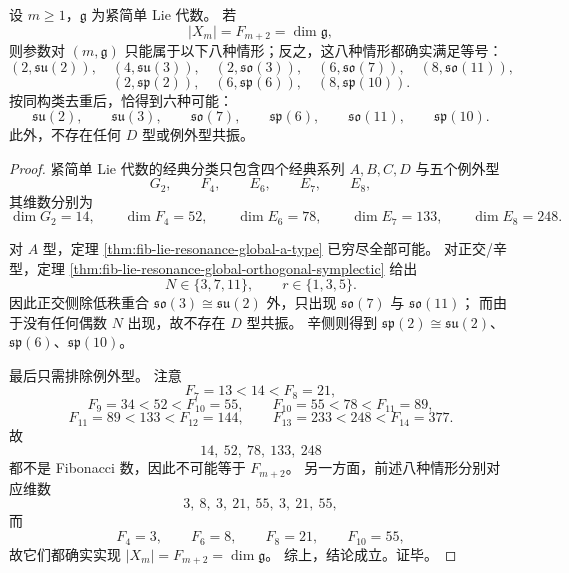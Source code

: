 \begin{theorem}\label{thm:fib-lie-resonance-global-classification}
设 \(m\ge 1\)，\(\mathfrak g\) 为紧简单 Lie 代数。
若
\[
|X_m|=F_{m+2}=\dim\mathfrak g,
\]
则参数对 \((m,\mathfrak g)\) 只能属于以下八种情形；反之，这八种情形都确实满足等号：
\[
(2,\mathfrak{su}(2)),\quad
(4,\mathfrak{su}(3)),\quad
(2,\mathfrak{so}(3)),\quad
(6,\mathfrak{so}(7)),\quad
(8,\mathfrak{so}(11)),
\]
\[
(2,\mathfrak{sp}(2)),\quad
(6,\mathfrak{sp}(6)),\quad
(8,\mathfrak{sp}(10)).
\]
按同构类去重后，恰得到六种可能：
\[
\mathfrak{su}(2),\qquad
\mathfrak{su}(3),\qquad
\mathfrak{so}(7),\qquad
\mathfrak{sp}(6),\qquad
\mathfrak{so}(11),\qquad
\mathfrak{sp}(10).
\]
此外，不存在任何 \(D\) 型或例外型共振。
\end{theorem}
\begin{proof}
紧简单 Lie 代数的经典分类只包含四个经典系列 \(A,B,C,D\) 与五个例外型
\[
G_2,\qquad F_4,\qquad E_6,\qquad E_7,\qquad E_8,
\]
其维数分别为
\[
\dim G_2=14,\qquad
\dim F_4=52,\qquad
\dim E_6=78,\qquad
\dim E_7=133,\qquad
\dim E_8=248.
\]

对 \(A\) 型，定理 \ref{thm:fib-lie-resonance-global-a-type} 已穷尽全部可能。
对正交/辛型，定理 \ref{thm:fib-lie-resonance-global-orthogonal-symplectic} 给出
\[
N\in\{3,7,11\},
\qquad
r\in\{1,3,5\}.
\]
因此正交侧除低秩重合 \(\mathfrak{so}(3)\cong\mathfrak{su}(2)\) 外，只出现 \(\mathfrak{so}(7)\) 与 \(\mathfrak{so}(11)\)；
而由于没有任何偶数 \(N\) 出现，故不存在 \(D\) 型共振。
辛侧则得到 \(\mathfrak{sp}(2)\cong\mathfrak{su}(2)\)、\(\mathfrak{sp}(6)\)、\(\mathfrak{sp}(10)\)。

最后只需排除例外型。
注意
\[
F_7=13<14<F_8=21,
\]
\[
F_9=34<52<F_{10}=55,
\qquad
F_{10}=55<78<F_{11}=89,
\]
\[
F_{11}=89<133<F_{12}=144,
\qquad
F_{13}=233<248<F_{14}=377.
\]
故
\[
14,\ 52,\ 78,\ 133,\ 248
\]
都不是 Fibonacci 数，因此不可能等于 \(F_{m+2}\)。
另一方面，前述八种情形分别对应维数
\[
3,\ 8,\ 3,\ 21,\ 55,\ 3,\ 21,\ 55,
\]
而
\[
F_4=3,\qquad F_6=8,\qquad F_8=21,\qquad F_{10}=55,
\]
故它们都确实实现
\(
|X_m|=F_{m+2}=\dim\mathfrak g
\)。
综上，结论成立。证毕。
\end{proof}

